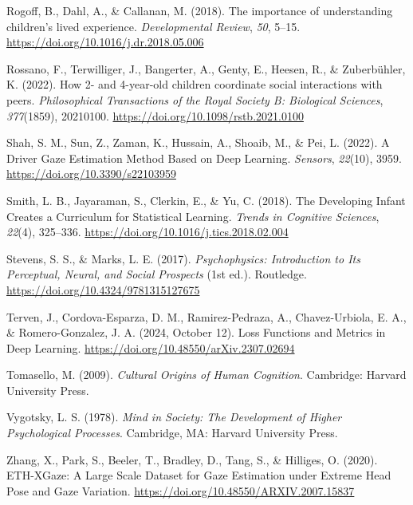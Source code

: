 \documentclass[
  man,floatsintext]{apa6}
\newlength{\cslhangindent}
\newenvironment{CSLReferences}[2] %
 {\begin{list}{}{%
  \setlength{\itemindent}{0pt}
  \setlength{\leftmargin}{0pt}
  \setlength{\parsep}{0pt}
  \ifodd #1
   \setlength{\leftmargin}{\cslhangindent}
   \setlength{\itemindent}{-1\cslhangindent}
  \fi
  \setlength{\itemsep}{#2\baselineskip}}}
 {\end{list}}
\begin{document}
\begin{CSLReferences}{1}{0}
Rogoff, B., Dahl, A., \& Callanan, M. (2018). The importance of understanding children's lived experience. \emph{Developmental Review}, \emph{50}, 5--15. \url{https://doi.org/10.1016/j.dr.2018.05.006}

Rossano, F., Terwilliger, J., Bangerter, A., Genty, E., Heesen, R., \& Zuberbühler, K. (2022). How 2- and 4-year-old children coordinate social interactions with peers. \emph{Philosophical Transactions of the Royal Society B: Biological Sciences}, \emph{377}(1859), 20210100. \url{https://doi.org/10.1098/rstb.2021.0100}

Shah, S. M., Sun, Z., Zaman, K., Hussain, A., Shoaib, M., \& Pei, L. (2022). A {Driver Gaze Estimation Method Based} on {Deep Learning}. \emph{Sensors}, \emph{22}(10), 3959. \url{https://doi.org/10.3390/s22103959}

Smith, L. B., Jayaraman, S., Clerkin, E., \& Yu, C. (2018). The {Developing Infant Creates} a {Curriculum} for {Statistical Learning}. \emph{Trends in Cognitive Sciences}, \emph{22}(4), 325--336. \url{https://doi.org/10.1016/j.tics.2018.02.004}

Stevens, S. S., \& Marks, L. E. (2017). \emph{Psychophysics: {Introduction} to {Its Perceptual}, {Neural}, and {Social Prospects}} (1st ed.). Routledge. \url{https://doi.org/10.4324/9781315127675}

Terven, J., Cordova-Esparza, D. M., Ramirez-Pedraza, A., Chavez-Urbiola, E. A., \& Romero-Gonzalez, J. A. (2024, October 12). Loss {Functions} and {Metrics} in {Deep Learning}. \url{https://doi.org/10.48550/arXiv.2307.02694}

Tomasello, M. (2009). \emph{Cultural {Origins} of {Human Cognition}}. Cambridge: Harvard University Press.

Vygotsky, L. S. (1978). \emph{Mind in {Society}: {The Development} of {Higher Psychological Processes}}. Cambridge, MA: Harvard University Press.

Zhang, X., Park, S., Beeler, T., Bradley, D., Tang, S., \& Hilliges, O. (2020). {ETH-XGaze}: {A Large Scale Dataset} for {Gaze Estimation} under {Extreme Head Pose} and {Gaze Variation}. \url{https://doi.org/10.48550/ARXIV.2007.15837}


\end{CSLReferences}
\end{document}
